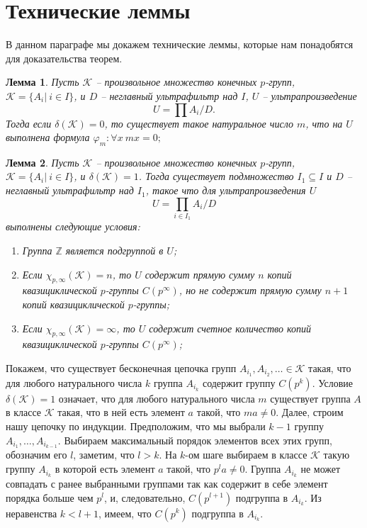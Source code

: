\documentclass[a4paper,11pt,twoside]{article}
\newtheorem{lemma}{Лемма}[section]
\def\proof{{\noindent{\bf Доказательство.}} }
\def\K{{\mathcal{K}}}
\def\Z{{\mathbb{Z}}}
\begin{document}
\section{Технические леммы}\label{sec:lemmas}

В данном параграфе мы докажем технические леммы, которые нам понадобятся для доказательства теорем. 


\begin{lemma}
Пусть $\K$ -- произвольное множество конечных $p$-групп, $\K = \{A_i | \ i \in I\}$, и $D$ -- неглавный ультрафильтр над $I$, $U$ -- ультрапроизведение 
$$U = \prod A_i \Big/ D.$$
Тогда если $\delta(\K) = 0$, то существует такое натуральное число $m$, что на $U$ выполнена формула $\varphi_m: \forall x \ mx = 0;$
\end{lemma}

\proof


\begin{lemma}\label{lemma:delta1UltraProduct}
Пусть $\K$ -- произвольное множество конечных $p$-групп, $\K = \{A_i | \ i \in I\}$, и $\delta(\K) = 1$. Тогда существует подмножество $I_1 \subseteq I$ и $D$ -- неглавный ультрафильтр над $I_1$, такое что для ультрапроизведения $U$
$$U = \prod_{i \in I_1} A_i \Big/ D$$
выполнены следующие условия:
\begin{enumerate}
\item Группа $\Z$ является подгруппой в $U$;
\item Если $\chi_{p,\infty}(\K) = n$, то $U$ содержит прямую сумму $n$ копий квазициклической $p$-группы $C(p^\infty)$, но не содержит прямую сумму $n+1$ копий квазициклической $p$-группы;
\item Если $\chi_{p,\infty}(\K) = \infty$, то $U$ содержит счетное количество копий квазициклической $p$-группы $C(p^\infty)$;
\end{enumerate}
\end{lemma}

\proof Покажем, что существует бесконечная цепочка групп $A_{i_1}, A_{i_2}, \ldots \in \K$ такая, что для любого натурального числа $k$ группа $A_{i_k}$ содержит группу $C(p^k)$. Условие $\delta(\K) = 1$ означает, что для любого натурального числа $m$ существует группа $A$ в классе $\K$ такая, что в ней есть элемент $a$ такой, что $ma \neq 0$. Далее, строим нашу цепочку по индукции. Предположим, что мы выбрали $k-1$ группу $A_{i_1}, \ldots, A_{i_{k-1}}$. Выбираем максимальный порядок элементов всех этих групп, обозначим его $l$, заметим, что $l > k$. На $k$-ом шаге выбираем в классе $\K$ такую группу $A_{i_k}$ в которой есть элемент $a$ такой, что $p^{l} a \neq 0$. Группа $A_{i_k}$ не может совпадать с ранее выбранными группами так как содержит в себе элемент порядка больше чем $p^l$, и, следовательно, $C(p^{l+1})$ подгруппа в $A_{i_k}$. Из неравенства $k < l+1$, имеем, что $C(p^k)$ подгруппа в $A_{i_k}$.
\end{document}
